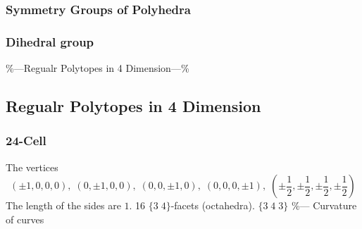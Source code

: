 \documentclass{article}
\begin{document}
\subsubsection{Symmetry Groups of Polyhedra}
\subsubsection{Dihedral group}
\%---Regualr Polytopes in 4 Dimension---\%
\subsection{Regualr Polytopes in 4 Dimension}
\subsubsection{24-Cell}
The vertices
\begin{displaymath}
(\pm1,0,0,0), \; (0,\pm1,0,0), \; (0,0,\pm1,0),\; (0,0,0,\pm1),\; (\pm\frac{1}{2},\pm\frac{1}{2},\pm\frac{1}{2},\pm\frac{1}{2})
\end{displaymath}
The length of the sides are $1$. 16 $\{3\;4\}$-facets (octahedra). $\{3\;4\;3\}$
\%--- Curvature of curves
\end{document}
